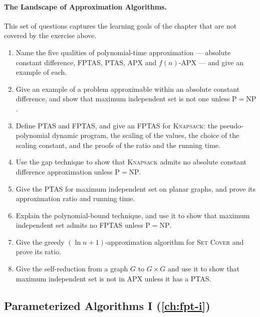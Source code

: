 \paragraph{The Landscape of Approximation Algorithms.}
This set of questions captures the learning goals of the chapter that are not
covered by the exercise above.
\begin{enumerate}
  \item Name the five qualities of polynomial-time approximation --- absolute
        constant difference, FPTAS, PTAS, APX and $f(n)$-APX --- and give an
        example of each.
  \item Give an example of a problem approximable within an absolute constant
        difference, and show that maximum independent set is not one unless
        $\mathrm{P} = \mathrm{NP}$.
  \item Define PTAS and FPTAS, and give an FPTAS for \textsc{Knapsack}: the
        pseudo-polynomial dynamic program, the scaling of the values, the
        choice of the scaling constant, and the proofs of the ratio and the
        running time.
  \item Use the gap technique to show that \textsc{Knapsack} admits no
        absolute constant difference approximation unless
        $\mathrm{P} = \mathrm{NP}$.
  \item Give the PTAS for maximum independent set on planar graphs, and prove
        its approximation ratio and running time.
  \item Explain the polynomial-bound technique, and use it to show that maximum
        independent set admits no FPTAS unless $\mathrm{P} = \mathrm{NP}$.
  \item Give the greedy $(\ln n + 1)$-approximation algorithm for
        \textsc{Set Cover} and prove its ratio.
  \item Give the self-reduction from a graph $G$ to $G \times G$ and use it to
        show that maximum independent set is not in APX unless it has a PTAS.
\end{enumerate}

\subsection*{Parameterized Algorithms I (\cref{ch:fpt-i})}

